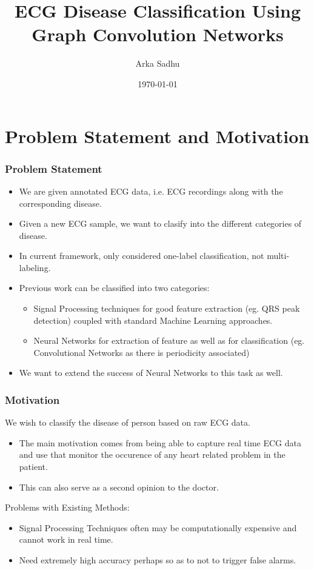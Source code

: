 \documentclass{beamer}
\title{ECG Disease Classification Using Graph Convolution Networks}
\author{Arka Sadhu}
\institute{IIT Bombay}
\date{\today}
\begin{document}


\begin{frame}
\titlepage
\end{frame}


\section{Problem Statement and Motivation}

\begin{frame}
  \frametitle{Problem Statement}
  \begin{itemize}
  \item We are given annotated ECG data, i.e. ECG recordings along with the corresponding disease.
  \item Given a new ECG sample, we want to clasify into the different categories of disease.
  \item In current framework, only considered one-label classification, not multi-labeling.
  \item Previous work can be classified into two categories:
    \begin{itemize}
    \item Signal Processing techniques for good feature extraction (eg. QRS peak detection) coupled with standard Machine Learning approaches.
    \item Neural Networks for extraction of feature as well as for classification (eg. Convolutional Networks as there is periodicity associated)
    \end{itemize}
  \item We want to extend the success of Neural Networks to this task as well.
  \end{itemize}
\end{frame}

\begin{frame}
  \frametitle{Motivation}
  We wish to classify the disease of person based on raw ECG data.
  \begin{itemize}
  \item The main motivation comes from being able to capture real time ECG data and use that monitor the occurence of any heart related problem in the patient.
  \item This can also serve as a second opinion to the doctor.
  \end{itemize}
  Problems with Existing Methods:
  \begin{itemize}
  \item Signal Processing Techniques often may be computationally expensive and cannot work in real time.
  \item Need extremely high accuracy perhaps so as to not to trigger false alarms.
  \end{itemize}
\end{frame}
\end{document}
